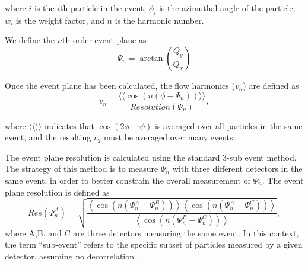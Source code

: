 where $i$ is the $i$th particle in the event, $\phi_i$ is the azimuthal angle of the particle, $w_i$ is the weight factor, and $n$ is the harmonic number.

We define the $n$th order event plane as
$$\Psi_n = \arctan \left( \frac{Q_y}{Q_x} \right) $$

Once the event plane has been calculated, the flow harmonics ($v_n$) are defined as
\begin{equation}
v_n = \frac{\langle \langle\cos(n(\phi - \Psi_n))\rangle \rangle}{Resolution(\Psi_n)},
\end{equation}

where $\langle \langle \rangle \rangle$ indicates that $\cos(2\phi-\psi)$ is averaged over all particles in the same event, and the resulting $v_2$ must be averaged over many events \cite{PhysRevC.58.1671}. 

The event plane resolution is calculated using the standard 3-sub event method\cite{PhysRevC.58.1671}. The strategy of this method is to measure $\Psi_n$ with three
different detectors in the same event, in order to better constrain the overall measurement of $\Psi_n$. The event plane resolution is defined as
\begin{equation}
Res(\Psi_n^A) = \sqrt{\frac{\left<\cos(n(\Psi_n^A - \Psi_n^B))\right>\left<\cos(n(\Psi_n^A - \Psi_n^C))\right>}{\left<\cos(n(\Psi_n^B - \Psi_n^C))\right>}},
\label{eqn:res}
\end{equation}
where A,B, and C are three detectors measuring the same event. In this context, the term ``sub-event'' refers to the specific subset of particles measured by a given detector, assuming no decorrelation \cite{PhysRevC.58.1671}.




